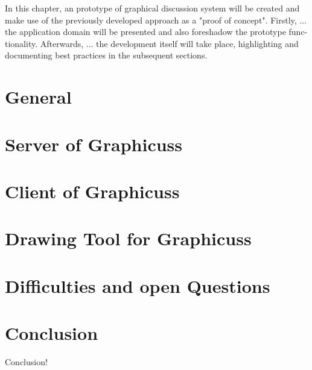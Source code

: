 In this chapter, an prototype of graphical discussion system will be created and make use of the previously developed approach as a "proof of concept". Firstly, ... the application domain will be presented and also foreshadow the prototype func- tionality. Afterwards, ... the development itself will take place, highlighting and documenting best practices in the subsequent sections.


\section{General}


\section{Server of Graphicuss}


\section{Client of Graphicuss}


\section{Drawing Tool for Graphicuss}


\section{Difficulties and open Questions}


\section{Conclusion}
Conclusion!
